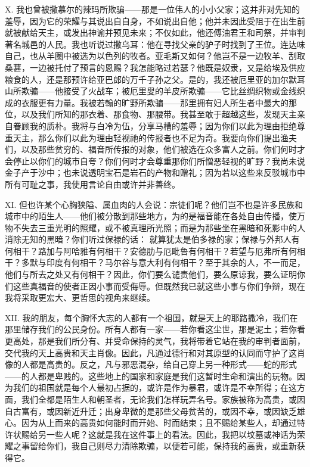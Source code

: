 X. 我也曾被撒慕尔的辣玛所欺骗——那是一位伟人的小小父家；这并非对先知的羞辱，因为它的荣耀与其说出自自身，不如说出自他；他并未因此受阻于在出生前就被献给天主，或发出神谕并预见未来；不仅如此，他还傅油君王和司祭，并审判著名城邑的人民。我也听说过撒乌耳：他在寻找父亲的驴子时找到了王位。连达味自己，也从羊圈中被选为以色列的牧者。亚毛斯又如何？他岂不是一边牧羊、刮取桑葚，一边被托付了预言的恩赐？我怎能略过若瑟？他既是奴隶，又是给埃及供应粮食的人，还是那预许给亚巴郎的万千子孙之父。是的，我还被厄里亚的加尔默耳山所欺骗——他接受了火战车；被厄里叟的羊皮所欺骗——它比丝绸织物或金线织成的衣服更有力量。我被若翰的旷野所欺骗——那里拥有妇人所生者中最大的那位，以及我们所知的那衣着、那食物、那腰带。我甚至敢于超越这些，发现天主亲自眷顾我的质朴。我将与白冷为伍，分享马槽的羞辱；因为你们以此为理由拒绝尊重天主，那么你们以此为理由轻视祂的传报者也不足为奇。我要向你们提出渔夫们，以及那些贫穷的、福音所传报的对象，他们被选在众多富人之前。你们何时才会停止以你们的城市自夸？你们何时才会尊重那你们所憎恶轻视的旷野？我尚未说金子产于沙中；也未说透明宝石是岩石的产物和赠礼；因为若以这些来反驳城市中所有可耻之事，我使用言论自由或许并非善终。\par

XI. 但也许某个心胸狭隘、属血肉的人会说：宗徒们呢？他们岂不也是许多民族和城市中的陌生人——他们被分散到那些地方，为的是福音能在各处自由传播，使万物不失去三重光明的照耀，或不被真理所光照；而是为那些坐在黑暗和死影中的人消除无知的黑暗？你们听过保禄的话： 就算犹太是伯多禄的家；保禄与外邦人有何相干？路加与阿哈雅有何相干？安德肋与厄毗鲁有何相干？若望与厄弗所有何相干？多默与印度有何相干？马尔谷与意大利有何相干？至于其余的人，不一而足，他们与所去之处又有何相干？因此，你们要么谴责他们，要么原谅我，要么证明你们这些真福音的使者正因小事而受侮辱。但既然我已就这些小事与你们争辩，现在我将采取更宏大、更哲思的视角来继续。\par

XII. 我的朋友，每个胸怀大志的人都有一个祖国，就是天上的耶路撒冷，我们在那里储存我们的公民身份。所有人都有一家——若你看这尘世，那是泥土；若你看更高处，那是我们所分有、并受命保持的灵气，我将带着它站在我的审判者面前，交代我的天上高贵和天主肖像。因此，凡通过德行和对其原型的认同而守护了这肖像的人都是高贵的。反之，凡与邪恶混杂，给自己穿上另一种形式——蛇的形式——的人都是卑贱的。这些地上的国家和家庭是我们这暂时生命和演出的玩物。因为我们的祖国就是每个人最初占据的，或许是作为暴君，或许是不幸所得；在这方面，我们全都是陌生人和朝圣者，无论我们怎样玩弄名号。家族被称为高贵，或因自古富有，或因新近升迁；出身卑微的是那些父母贫苦的，或因不幸，或因缺乏雄心。因为从上而来的高贵如何能时而开始、时而结束；且不赐给某些人，却通过特许状赐给另一些人呢？这就是我在这件事上的看法。因此，我把以坟墓或神话为荣耀之事留给你们，我自己则尽力清除欺骗，以便若可能，保持我的高贵，或重新获得它。\par

